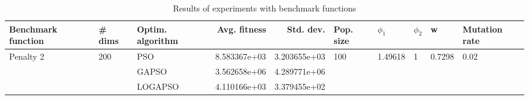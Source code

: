 \begin{table}
\centering
\caption{Results of experiments with benchmark functions}
\begin{tabular}{lllrrlllll}
\toprule
        Benchmark function &              \# dims & Optim. algorithm &  Avg. fitness &    Std. dev. &            Pop. size &               $\phi_{1}$ &         $\phi_{2}$ &                       w &         Mutation rate \\
\midrule
\multirow{3}{*}{Penalty 2} & \multirow{3}{*}{200} &              PSO &  8.583367e+03 & 3.203655e+03 & \multirow{3}{*}{100} & \multirow{3}{*}{1.49618} & \multirow{3}{*}{1} & \multirow{3}{*}{0.7298} & \multirow{3}{*}{0.02} \\
                           &                      &            GAPSO &  3.562658e+06 & 4.289771e+06 &                      &                          &                    &                         &                       \\
                           &                      &          LOGAPSO &  4.110166e+03 & 3.379455e+02 &                      &                          &                    &                         &                       \\
\bottomrule
\end{tabular}
\end{table}

